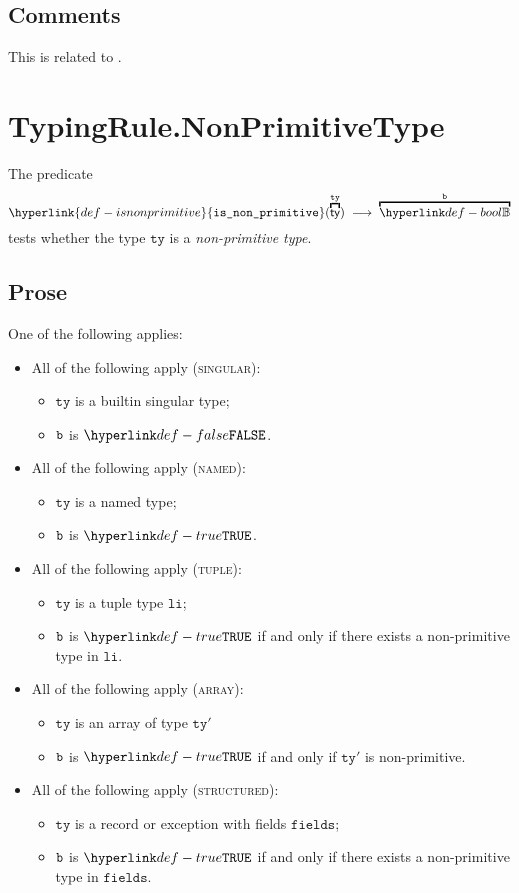 \documentclass{book}
\newcommand\isnonprimitive[0]{\hyperlink{def-isnonprimitive}{\texttt{is\_non\_primitive}}}
\newcommand\tty[0]{\texttt{ty}}
\newcommand\fields[0]{\texttt{fields}}
\newcommand\vli[0]{\texttt{li}}
\begin{document}
\subsection{Comments}
This is related to .

\section{TypingRule.NonPrimitiveType \label{sec:TypingRule.NonPrimitiveType}}
\hypertarget{def-isnonprimitive}{}
The predicate
\[
  \isnonprimitive(\overname{\ty}{\tty}) \;\aslto\; \overname{\Bool}{\vb}
\]
tests whether the type $\tty$ is a \emph{non-primitive type}.

\subsection{Prose}
One of the following applies:
\begin{itemize}
  \item All of the following apply (\textsc{singular}):
  \begin{itemize}
  \item $\tty$ is a builtin singular type;
  \item $\texttt{b}$ is $\False$.
  \end{itemize}
  \item All of the following apply (\textsc{named}):
  \begin{itemize}
    \item $\tty$ is a named type;
    \item $\texttt{b}$ is $\True$.
  \end{itemize}
  \item All of the following apply (\textsc{tuple}):
  \begin{itemize}
    \item $\tty$ is a tuple type $\vli$;
    \item $\texttt{b}$ is $\True$ if and only if there exists a non-primitive type in $\vli$.
  \end{itemize}
  \item All of the following apply (\textsc{array}):
    \begin{itemize}
    \item $\tty$ is an array of type $\tty'$
    \item $\texttt{b}$ is $\True$ if and only if $\tty'$ is non-primitive.
    \end{itemize}
  \item All of the following apply (\textsc{structured}):
    \begin{itemize}
    \item $\tty$ is a record or exception with fields $\fields$;
    \item $\texttt{b}$ is $\True$ if and only if there exists a non-primitive type in $\fields$.
    \end{itemize}
\end{itemize}
\end{document}
